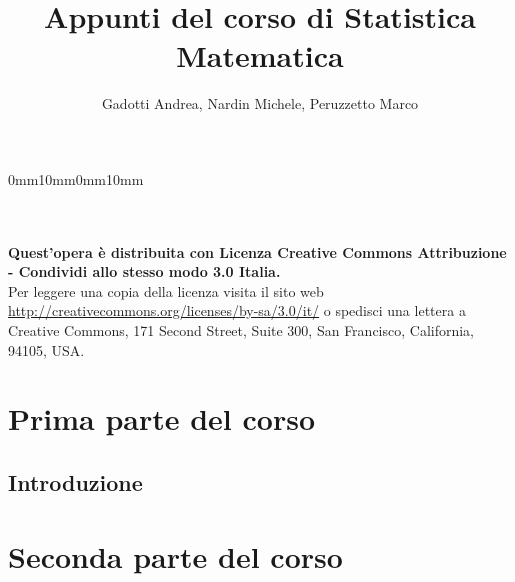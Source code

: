 \documentclass[11pt,a4paper]{book}
\title{Appunti del corso di Statistica Matematica}
\author{Gadotti Andrea, Nardin Michele, Peruzzetto Marco}
\date{}
\begin{document}
\setmarginsrb{35mm}{20mm}{25mm}{35mm}%
             {0mm}{10mm}{0mm}{10mm}
             
\maketitle

\null
\vfill
\noindent \ccbysa  \\
\\
\textbf{Quest'opera è distribuita con Licenza Creative Commons Attribuzione - Condividi allo stesso modo 3.0 Italia.} \\
Per leggere una copia della licenza visita il sito web \url{http://creativecommons.org/licenses/by-sa/3.0/it/} o spedisci una lettera a Creative Commons, 171 Second
Street, Suite 300, San Francisco, California, 94105, USA.


\newpage
{}

\tableofcontents
\chapter{Prima parte del corso}
\section{Introduzione}











\chapter{Seconda parte del corso}








\end{document}
